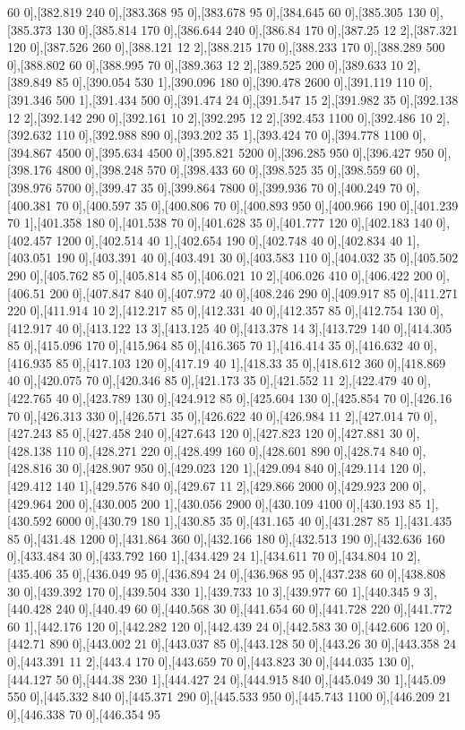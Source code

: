{60 0],[382.819 240 0],[383.368 95 0],[383.678 95 0],[384.645 60 0],[385.305 130 0],[385.373 130 0],[385.814 170 0],[386.644 240 0],[386.84 170 0],[387.25 12 2],[387.321 120 0],[387.526 260 0],[388.121 12 2],[388.215 170 0],[388.233 170 0],[388.289 500 0],[388.802 60 0],[388.995 70 0],[389.363 12 2],[389.525 200 0],[389.633 10 2],[389.849 85 0],[390.054 530 1],[390.096 180 0],[390.478 2600 0],[391.119 110 0],[391.346 500 1],[391.434 500 0],[391.474 24 0],[391.547 15 2],[391.982 35 0],[392.138 12 2],[392.142 290 0],[392.161 10 2],[392.295 12 2],[392.453 1100 0],[392.486 10 2],[392.632 110 0],[392.988 890 0],[393.202 35 1],[393.424 70 0],[394.778 1100 0],[394.867 4500 0],[395.634 4500 0],[395.821 5200 0],[396.285 950 0],[396.427 950 0],[398.176 4800 0],[398.248 570 0],[398.433 60 0],[398.525 35 0],[398.559 60 0],[398.976 5700 0],[399.47 35 0],[399.864 7800 0],[399.936 70 0],[400.249 70 0],[400.381 70 0],[400.597 35 0],[400.806 70 0],[400.893 950 0],[400.966 190 0],[401.239 70 1],[401.358 180 0],[401.538 70 0],[401.628 35 0],[401.777 120 0],[402.183 140 0],[402.457 1200 0],[402.514 40 1],[402.654 190 0],[402.748 40 0],[402.834 40 1],[403.051 190 0],[403.391 40 0],[403.491 30 0],[403.583 110 0],[404.032 35 0],[405.502 290 0],[405.762 85 0],[405.814 85 0],[406.021 10 2],[406.026 410 0],[406.422 200 0],[406.51 200 0],[407.847 840 0],[407.972 40 0],[408.246 290 0],[409.917 85 0],[411.271 220 0],[411.914 10 2],[412.217 85 0],[412.331 40 0],[412.357 85 0],[412.754 130 0],[412.917 40 0],[413.122 13 3],[413.125 40 0],[413.378 14 3],[413.729 140 0],[414.305 85 0],[415.096 170 0],[415.964 85 0],[416.365 70 1],[416.414 35 0],[416.632 40 0],[416.935 85 0],[417.103 120 0],[417.19 40 1],[418.33 35 0],[418.612 360 0],[418.869 40 0],[420.075 70 0],[420.346 85 0],[421.173 35 0],[421.552 11 2],[422.479 40 0],[422.765 40 0],[423.789 130 0],[424.912 85 0],[425.604 130 0],[425.854 70 0],[426.16 70 0],[426.313 330 0],[426.571 35 0],[426.622 40 0],[426.984 11 2],[427.014 70 0],[427.243 85 0],[427.458 240 0],[427.643 120 0],[427.823 120 0],[427.881 30 0],[428.138 110 0],[428.271 220 0],[428.499 160 0],[428.601 890 0],[428.74 840 0],[428.816 30 0],[428.907 950 0],[429.023 120 1],[429.094 840 0],[429.114 120 0],[429.412 140 1],[429.576 840 0],[429.67 11 2],[429.866 2000 0],[429.923 200 0],[429.964 200 0],[430.005 200 1],[430.056 2900 0],[430.109 4100 0],[430.193 85 1],[430.592 6000 0],[430.79 180 1],[430.85 35 0],[431.165 40 0],[431.287 85 1],[431.435 85 0],[431.48 1200 0],[431.864 360 0],[432.166 180 0],[432.513 190 0],[432.636 160 0],[433.484 30 0],[433.792 160 1],[434.429 24 1],[434.611 70 0],[434.804 10 2],[435.406 35 0],[436.049 95 0],[436.894 24 0],[436.968 95 0],[437.238 60 0],[438.808 30 0],[439.392 170 0],[439.504 330 1],[439.733 10 3],[439.977 60 1],[440.345 9 3],[440.428 240 0],[440.49 60 0],[440.568 30 0],[441.654 60 0],[441.728 220 0],[441.772 60 1],[442.176 120 0],[442.282 120 0],[442.439 24 0],[442.583 30 0],[442.606 120 0],[442.71 890 0],[443.002 21 0],[443.037 85 0],[443.128 50 0],[443.26 30 0],[443.358 24 0],[443.391 11 2],[443.4 170 0],[443.659 70 0],[443.823 30 0],[444.035 130 0],[444.127 50 0],[444.38 230 1],[444.427 24 0],[444.915 840 0],[445.049 30 1],[445.09 550 0],[445.332 840 0],[445.371 290 0],[445.533 950 0],[445.743 1100 0],[446.209 21 0],[446.338 70 0],[446.354 95 }

